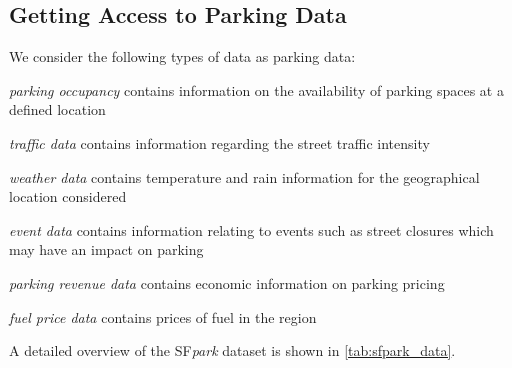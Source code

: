 	\subsection{Getting Access to Parking Data}
	We consider the following types of data as parking data: 
	\begin{romanlist}
		\item \textit{parking occupancy} contains information on the availability of parking spaces at a defined location
		\item \textit{traffic data} contains information regarding the street traffic intensity
		\item \textit{weather data} contains temperature and rain information for the geographical location considered
		\item \textit{event data} contains information relating to events such as street closures which may have an impact on parking
		\item \textit{parking revenue data} contains economic information on parking pricing
		\item \textit{fuel price data} contains prices of fuel in the region
	\end{romanlist}
	
	A detailed overview of the SF\textit{park} dataset is shown in \cref{tab:sfpark_data}.
	
